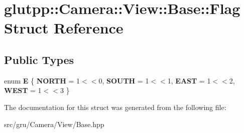 \hypertarget{structglutpp_1_1Camera_1_1View_1_1Base_1_1Flag}{\section{glutpp\-:\-:\-Camera\-:\-:\-View\-:\-:\-Base\-:\-:\-Flag \-Struct \-Reference}
\label{structglutpp_1_1Camera_1_1View_1_1Base_1_1Flag}
}
\subsection*{\-Public \-Types}
\begin{DoxyCompactItemize}
\item 
enum {\bfseries \-E} \{ {\bfseries \-N\-O\-R\-T\-H} =  1$<$$<$0, 
{\bfseries \-S\-O\-U\-T\-H} =  1$<$$<$1, 
{\bfseries \-E\-A\-S\-T} =  1$<$$<$2, 
{\bfseries \-W\-E\-S\-T} =  1$<$$<$3
 \}
\end{DoxyCompactItemize}


\-The documentation for this struct was generated from the following file\-:\begin{DoxyCompactItemize}
\item 
src/gru/\-Camera/\-View/\-Base.\-hpp\end{DoxyCompactItemize}
